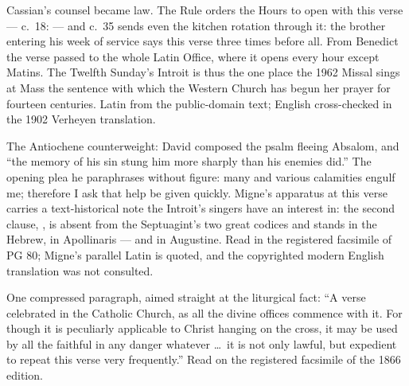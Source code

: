 \begin{witnessnote}
Cassian's counsel became law. The Rule orders the Hours to open with this
verse --- c.~18:  --- and c.~35 sends even the
kitchen rotation through it: the brother entering his week of service says
this verse three times before all. From Benedict the verse passed to the
whole Latin Office, where it opens every hour except Matins. The Twelfth
Sunday's Introit is thus the one place the 1962 Missal sings at Mass the
sentence with which the Western Church has begun her prayer for fourteen
centuries. Latin from the public-domain text; English cross-checked in the
1902 Verheyen translation.
\end{witnessnote}

\begin{witnessnote}
The Antiochene counterweight: David composed the psalm fleeing Absalom, and
``the memory of his sin stung him more sharply than his enemies did.'' The
opening plea he paraphrases without figure: many and various calamities
engulf me; therefore I ask that help be given quickly. Migne's apparatus at
this verse carries a text-historical note the Introit's singers have an
interest in: the second clause, , is
absent from the Septuagint's two great codices and stands in the Hebrew, in
Apollinaris --- and in Augustine. Read in the registered facsimile of PG 80;
Migne's parallel Latin is quoted, and the copyrighted modern English
translation was not consulted.
\end{witnessnote}

\begin{witnessnote}
One compressed paragraph, aimed straight at the liturgical fact: ``A verse
celebrated in the Catholic Church, as all the divine offices commence with
it. For though it is peculiarly applicable to Christ hanging on the cross, it
may be used by all the faithful in any danger whatever \dots\ it is not only
lawful, but expedient to repeat this verse very frequently.'' Read on the
registered facsimile of the 1866 edition.
\end{witnessnote}

\elementguard
